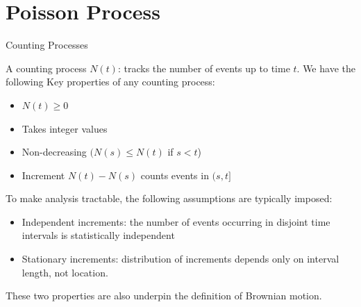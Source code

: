 \documentclass{beamer}
\begin{document}
\section{Poisson Process}
\begin{frame}{Counting Processes}
    \par A counting process \( N(t) \): tracks the number of events up to time \( t \). 
    We have the following Key properties of any counting process:
    \begin{itemize}
        \item \( N(t) \geq 0 \)
        \item Takes integer values
        \item Non-decreasing \( (N(s) \leq N(t) \) if \( s < t \))
        \item Increment \( N(t) - N(s) \) counts events in \( (s, t] \)
    \end{itemize}
    \par To make analysis tractable, the following assumptions are typically imposed:
     \begin{itemize}
        \item Independent increments: the number of events occurring in disjoint time
            intervals is statistically independent
        \item Stationary increments: distribution of increments depends only on interval length, not location.
    \end{itemize}
    \par These two properties are also underpin the definition of Brownian motion.
\end{frame}
\end{document}
